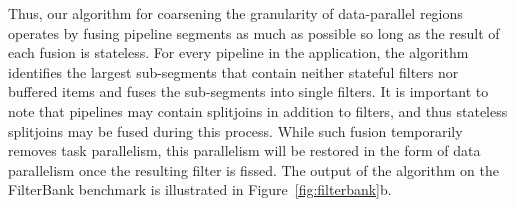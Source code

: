 Thus, our algorithm for coarsening the granularity of data-parallel
regions operates by fusing pipeline segments as much as possible so
long as the result of each fusion is stateless.  For every pipeline in
the application, the algorithm identifies the largest sub-segments
that contain neither stateful filters nor buffered items and fuses the
sub-segments into single filters.  It is important to note that
pipelines may contain splitjoins in addition to filters, and thus
stateless splitjoins may be fused during this process.  While such
fusion temporarily removes task parallelism, this parallelism will be
restored in the form of data parallelism once the resulting filter is
fissed.  The output of the algorithm on the FilterBank benchmark is
illustrated in Figure~\ref{fig:filterbank}b.





